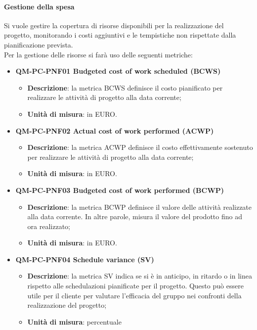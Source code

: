 			\paragraph{Gestione della spesa }
				Si vuole gestire la copertura di risorse disponibili per la realizzazione del progetto, monitorando i costi aggiuntivi e le tempistiche non rispettate dalla pianificazione prevista.\\
				Per la gestione delle risorse si farà uso delle seguenti metriche:
				\begin{itemize}
					\item\textbf{QM-PC-PNF01 Budgeted cost of work scheduled (BCWS)}
						\begin{itemize}
							\item\textbf{Descrizione}: la metrica BCWS definisce il costo pianificato per realizzare le attività di progetto alla data corrente;
							\item\textbf{Unità di misura}: in EURO.
						\end{itemize}
					\item\textbf{QM-PC-PNF02 Actual cost of work performed (ACWP)}
						\begin{itemize}
							\item\textbf{Descrizione}: la metrica ACWP definisce il costo effettivamente sostenuto per realizzare le attività di progetto alla data corrente;
							\item\textbf{Unità di misura}: in EURO.
						\end{itemize}
					\item\textbf{QM-PC-PNF03 Budgeted cost of work performed (BCWP)}
						\begin{itemize}
							\item\textbf{Descrizione}: la metrica BCWP definisce il valore delle attività realizzate alla data corrente. In altre parole, misura il valore del prodotto fino ad ora realizzato;
							\item\textbf{Unità di misura}: in EURO.
						\end{itemize}
					\item\textbf{QM-PC-PNF04 Schedule variance (SV)}
						\begin{itemize}
							\item\textbf{Descrizione}: la metrica SV indica se si è in anticipo, in ritardo o in linea rispetto alle schedulazioni pianificate per il progetto. Questo può essere utile per il cliente per valutare l'efficacia del gruppo nei confronti della realizzazione del progetto;
							\item\textbf{Unità di misura}: percentuale

\end{itemize}
\end{itemize}
